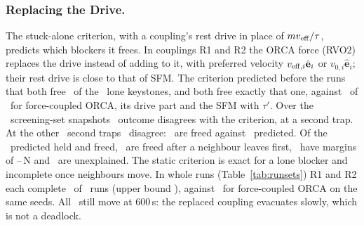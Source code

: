 \subsubsection{Replacing the Drive.}
The stuck-alone criterion, with a coupling's rest drive in place of $mv_{\rm eff}/\tau$, predicts which blockers it frees. In couplings R1 and R2 the ORCA force (RVO2) replaces the drive instead of adding to it, with preferred velocity $v_{{\rm eff},i}\hat{\mathbf e}_i$ or $v_{0,i}\hat{\mathbf e}_i$; their rest drive is close to that of SFM. The criterion predicted before the runs that both free \RzTonezeroLoneFreed\ of the \RzTonezeroLoneN\ lone keystones, and both free exactly that one, against \RzTonezeroLoneOrcaFreed\ of \RzTonezeroLoneN\ for force-coupled ORCA, its drive part and the SFM with $\tau'$. Over the \RzTonezeroScreenN\ screening-set snapshots \RzTonezeroScreenDisagree\ outcome disagrees with the criterion, at a second trap. At the other \RzTonezeroOtherN\ second traps \RzTonezeroOtherDisagree\ disagree: \RzTonezeroOtherFreed\ are freed against \RzTonezeroOtherPredFreed\ predicted. Of the \RzTonezeroOtherHeldFreed\ predicted held and freed, \RzTonezeroOtherNeigh\ are freed after a neighbour leaves first, \RzTonezeroOtherSmall\ have margins of \RzTonezeroOtherSmallMin--\RzTonezeroOtherSmallMax\,N and \RzTonezeroOtherUnexpl\ are unexplained. The static criterion is exact for a lone blocker and incomplete once neighbours move. In whole runs (Table~\ref{tab:runsets}) R1 and R2 each complete \RzToneoneK\ of \RzToneoneN\ runs (upper bound \RzToneoneHi), against \RzToneoneRvoK\ for force-coupled ORCA on the same seeds. All \RzToneoneMoving\ still move at 600\,s: the replaced coupling evacuates slowly, which is not a deadlock.

